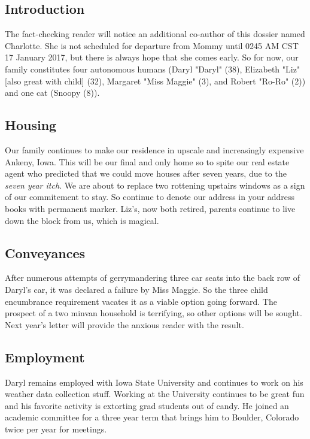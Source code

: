 \documentclass[letterpaper,11pt]{article}
\begin{document}
\begin{multicols}{2}

\section{Introduction} 

The fact-checking reader will notice an additional co-author of this dossier
named Charlotte. She is not scheduled for departure from Mommy until 0245 AM CST 17
January 2017, but there is always hope that she comes early.  So for now, our
family constitutes four autonomous humans (Daryl "Daryl" (38), Elizabeth
"Liz"[also great with child] (32), Margaret "Miss Maggie" (3), and Robert
"Ro-Ro" (2)) and one cat (Snoopy (8)).

\subsection{Housing}

Our family continues to make our residence in upscale and increasingly
expensive Ankeny, Iowa.  This will be our final and only home so to spite our
real estate agent who predicted that we could move houses after seven years, due
to the \textit{seven year itch}.  We are about to replace two rottening upstairs
windows as a sign of our commitement to stay.  So continue to denote our address
in your address books with permanent marker.  Liz's, now both retired, parents
continue to live down the block from us, which is magical.

\subsection{Conveyances}

After numerous attempts of gerrymandering three car seats into the back row of
Daryl's car, it was declared a failure by Miss Maggie.  So the three child
encumbrance requirement vacates it as a viable option going forward.  The
prospect of a two minvan household is terrifying, so other options will be
sought.  Next year's letter will provide the anxious reader with the result.

\subsection{Employment}
Daryl remains employed with Iowa State University and continues to work on 
his weather data collection stuff.  Working at the University continues to be
great fun and his favorite activity is extorting grad students out of candy. He
joined an academic committee for a three year term that brings him to Boulder, 
Colorado twice per year for meetings.


\end{multicols}
\end{document}
